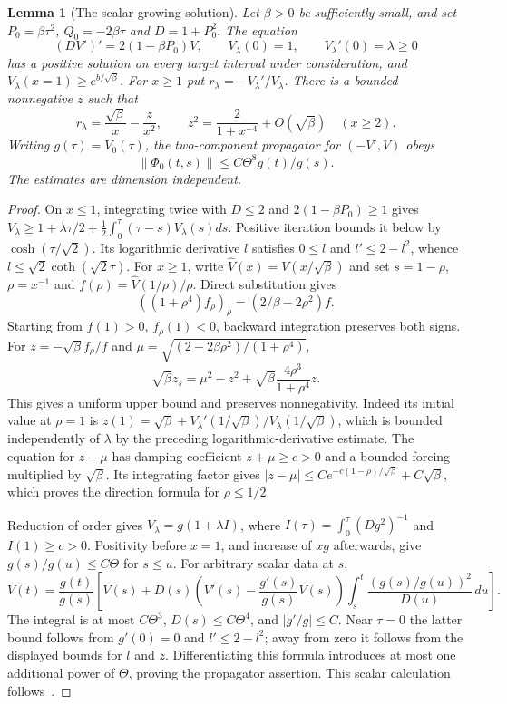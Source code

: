 \documentclass[11pt]{article}
\newtheorem{lemma}[theorem]{Lemma}
\theoremstyle{definition}
\begin{document}
\begin{lemma}[The scalar growing solution]\label{lem:scalar-growth}
Let $\beta>0$ be sufficiently small, and set $P_0=\beta\tau^2$,
$Q_0=-2\beta\tau$ and $D=1+P_0^2$. The equation
\[
 (DV')'=2(1-\beta P_0)V,\qquad V_\lambda(0)=1,
 \qquad V_\lambda'(0)=\lambda\geq0
\]
has a positive solution on every target interval under consideration, and
$V_\lambda(x=1)\geq e^{b/\sqrt\beta}$. For $x\geq1$ put
$r_\lambda=-V_\lambda'/V_\lambda$. There is a bounded nonnegative $z$
such that
\[
 r_\lambda=\frac{\sqrt\beta}{x}-\frac z{x^2},\qquad
 z^2=\frac2{1+x^{-4}}+O(\sqrt\beta)\quad(x\geq2).
\]
Writing $g(\tau)=V_0(\tau)$, the two-component propagator for
$(-V',V)$ obeys
\[ \|\Phi_0(t,s)\|\leq C\Theta^8g(t)/g(s). \]
The estimates are dimension independent.
\end{lemma}
\begin{proof}
On $x\leq1$, integrating twice with $D\leq2$ and
$2(1-\beta P_0)\geq1$ gives
$V_\lambda\geq1+\lambda\tau/2+\tfrac12\int_0^\tau(\tau-s)V_\lambda(s)ds$.
Positive iteration bounds it below by $\cosh(\tau/\sqrt2)$.
Its logarithmic derivative $l$ satisfies $0\leq l$ and
$l'\leq2-l^2$, whence $l\leq\sqrt2\coth(\sqrt2\tau)$.
For $x\geq1$, write $\widehat V(x)=V(x/\sqrt\beta)$
and set $s=1-\rho$, $\rho=x^{-1}$ and
$f(\rho)=\widehat V(1/\rho)/\rho$. Direct substitution gives
\[
 ((1+\rho^4)f_\rho)_\rho=(2/\beta-2\rho^2)f.
\]
Starting from $f(1)>0$, $f_\rho(1)<0$, backward integration preserves
both signs. For $z=-\sqrt\beta f_\rho/f$ and
$\mu=\sqrt{(2-2\beta\rho^2)/(1+\rho^4)}$,
\[
 \sqrt\beta z_s=\mu^2-z^2+
               \sqrt\beta\frac{4\rho^3}{1+\rho^4}z.
\]
This gives a uniform upper bound and preserves nonnegativity.
Indeed its initial value at $\rho=1$ is
$z(1)=\sqrt\beta+V_\lambda'(1/\sqrt\beta)/V_\lambda(1/\sqrt\beta)$,
which is bounded independently of $\lambda$ by the preceding
logarithmic-derivative estimate.
The equation for $z-\mu$ has damping coefficient $z+\mu\geq c>0$
and a bounded forcing multiplied by $\sqrt\beta$. Its integrating
factor gives $|z-\mu|\leq Ce^{-c(1-\rho)/\sqrt\beta}+C\sqrt\beta$,
which proves the direction formula for $\rho\leq1/2$.

Reduction of order gives
$V_\lambda=g(1+\lambda I)$, where $I(\tau)=\int_0^\tau(Dg^2)^{-1}$
and $I(1)\geq c>0$. Positivity before $x=1$, and increase of $xg$
afterwards, give $g(s)/g(u)\leq C\Theta$ for $s\leq u$.
For arbitrary scalar data at $s$,
\[
 V(t)=\frac{g(t)}{g(s)}\left[
 V(s)+D(s)\left(V'(s)-\frac{g'(s)}{g(s)}V(s)\right)
 \int_s^t\frac{(g(s)/g(u))^2}{D(u)}\,du\right].
\]
The integral is at most $C\Theta^3$, $D(s)\leq C\Theta^4$, and
$|g'/g|\leq C$. Near $\tau=0$ the latter bound follows from
$g'(0)=0$ and $l'\leq2-l^2$; away from zero it follows from the
displayed bounds for $l$ and $z$.
Differentiating this formula introduces at most one additional
power of $\Theta$, proving the propagator assertion. This scalar
calculation follows~\cite[\S\S4.4--4.5]{OAI}.
\end{proof}
\end{document}
